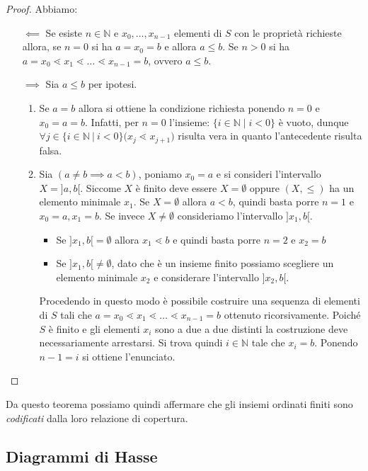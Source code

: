 \begin{proof}
	Abbiamo:
\begin{itemize}
		\item[$\impliedby$] Se esiste $n \in \mathbb{N}$ e $x_{0},\ldots, x_{n-1}$ elementi di $S$ con le proprietà richieste allora, se $n=0$ si ha $a=x_{0}=b$ e allora $a \leq b$. Se $n>0$ si ha $a=x_{0} \lessdot x_{1} \lessdot \ldots \lessdot x_{n-1}=b$, ovvero $a \leq b$.
	
	\item[$\implies$] Sia $a \leq b$ per ipotesi.
	\begin{enumerate}
		\item Se $a=b$ allora si ottiene la condizione richiesta ponendo $n=0$ e $x_{0}=a=b$. Infatti, per $n=0$ l'insieme: $\{i \in \mathbb{N} \; | \; i <0\}$ è vuoto, dunque $\forall j \in \{i \in \mathbb{N} \ | \ i < 0 \} \bigl(x_{j} \lessdot x_{j+1}\bigr)$ risulta vera in quanto l'antecedente risulta falsa.
		\item Sia $(a\neq b \implies a < b)$, poniamo $x_{0}=a$ e si consideri l'intervallo $X = ]a,b[$. Siccome $X$ è finito deve essere $X = \emptyset$ oppure $(X,\leq)$ ha un elemento minimale $x_{1}$. Se $X=\emptyset$ allora $a < b$, quindi basta porre $n=1$ e $x_{0}=a, x_{1}=b$. Se invece $X \neq \emptyset$ consideriamo l'intervallo $]x_{1},b[$.
		\begin{itemize}
			\item Se $]x_{1},b[ = \emptyset$ allora $x_{1} \lessdot b$ e quindi basta porre $n=2$ e $x_{2}=b$
			\item Se $]x_{1},b[ \neq \emptyset$, dato che è un insieme finito possiamo scegliere un elemento minimale $x_{2}$ e considerare l'intervallo $]x_{2},b[$.
		\end{itemize}
		Procedendo in questo modo è possibile costruire una sequenza di elementi di $S$ tali che $a=x_{0} \lessdot x_{1} \lessdot \ldots \lessdot x_{n-1} = b$ ottenuto ricorsivamente. Poiché $S$ è finito e gli elementi $x_{i}$ sono a due a due distinti la costruzione deve necessariamente arrestarsi. Si trova quindi $i \in \mathbb{N}$ tale che $x_{i}=b$. Ponendo $n-1=i$ si ottiene l'enunciato.
	\end{enumerate}
\end{itemize}
\end{proof}

Da questo teorema possiamo quindi affermare che gli insiemi ordinati finiti sono \textit{codificati} dalla loro relazione di copertura.

\subsection{Diagrammi di Hasse}

